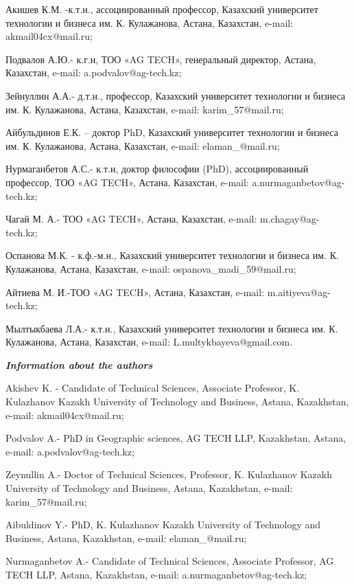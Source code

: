 \begin{info}

Акишев К.М. -к.т.н., ассоциированный профессор, Казахский университет
технологии и бизнеса им. К. Кулажанова, Астана, Казахстан, e-mail:
akmail04cx@mail.ru;

Подвалов А.Ю.- к.г.н, ТОО «AG TECH», генеральный директор, Астана,
Казахстан, e-mail: a.podvalov@ag-tech.kz;

Зейнуллин А.А.- д.т.н., профессор, Казахский университет технологии и
бизнеса им. К. Кулажанова, Астана, Казахстан, e-mail:
karim\_57@mail.ru;

Айбульдинов Е.К. -- доктор PhD, Казахский университет технологии и
бизнеса им. К. Кулажанова, Астана, Казахстан, e-mail:
elaman\_@mail.ru;

Нурмаганбетов А.С.- к.т.н, доктор философии (PhD), ассоциированный
профессор, ТОО «AG TECH», Астана, Казахстан, e-mail:
a.nurmaganbetov@ag-tech.kz;

Чагай М. А.- ТОО «AG TECH», Астана, Казахстан, e-mail:
m.chagay@ag-tech.kz;

Оспанова М.К. - к.ф.-м.н., Казахский университет технологии и бизнеса
им. К. Кулажанова, Астана, Казахстан, e-mail:
ospanova\_madi\_59@mail.ru;

Айтиева М. И.-ТОО «AG TECH», Астана, Казахстан, e-mail:
m.aitiyeva@ag-tech.kz;

Мылтыкбаева Л.А.- к.т.н., Казахский университет технологии и бизнеса
им.  К. Кулажанова, Астана, Казахстан, e-mail:
L.multykbayeva@gmail.com.

\hspace{1em}\emph{{\bfseries Information about the authors}}

Akishev K. - Candidate of Technical Sciences, Associate Professor, K.
Kulazhanov Kazakh University of Technology and Business, Astana,
Kazakhstan, e-mail: akmail04cx@mail.ru;

Podvalov A.- PhD in Geographic sciences, AG TECH LLP, Kazakhstan,
Astana, e-mail: a.podvalov@ag-tech.kz;

Zeynullin A.- Doctor of Technical Sciences, Professor, K. Kulazhanov
Kazakh University of Technology and Business, Astana, Kazakhstan,
e-mail: karim\_57@mail.ru;

Aibuldinov Y.- PhD, K. Kulazhanov Kazakh University of Technology and
Business, Astana, Kazakhstan, e-mail: elaman\_@mail.ru;

Nurmaganbetov A.- Candidate of Technical Sciences, Associate
Professor, AG TECH LLP, Astana, Kazakhstan, e-mail:
a.nurmaganbetov@ag-tech.kz;


\end{info}
